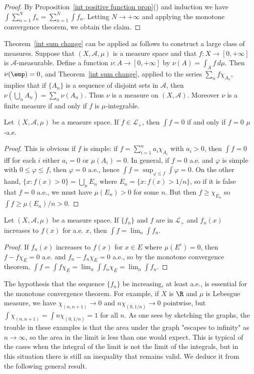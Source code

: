 \begin{proof}
By Proposition~\ref{int positive function prop}() and induction we have $\int\sum_{n=1}^{N}f_n=\sum_{n=1}^{N}\int f_n$. Letting $N\to+\infty$ and applying the monotone convergence theorem, we obtain the claim.
\end{proof}
\begin{example}\label{measure defined by int}
Theorem~\ref{int sum change} can be applied as follows to construct a large class of measures. Suppose that $(X,\mathcal{A},\mu)$ is a measure space and that $f:X\to[0,+\infty]$ is $\mathcal{A}$-measurable. Define a function $\nu:A\to[0,+\infty]$ by $\nu(A)=\int_Af\,d\mu$. Then $\nu(\emp)=0$, and Theorem~\ref{int sum change}, applied to the series $\sum_nf\chi_{A_n}$, implies that if $\{A_n\}$ is a sequence of disjoint sets in $\mathcal{A}$, then $\nu(\bigcup_nA_n)=\sum_n\nu(A_n)$. Thus $\nu$ is a measure on $(X,\mathcal{A})$. Moreover $\nu$ is a finite measure if and only if $f$ is $\mu$-integrable.
\end{example}
\begin{proposition}\label{int zero iff a.e. zero}
Let $(X,\mathcal{A},\mu)$ be a measure space. If $f\in\mathcal{L}_+$, then $\int f=0$ if and only if $f=0$ $\mu$-a.e.
\end{proposition}
\begin{proof}
This is obvious if $f$ is simple: if $f=\sum_{i=1}^{n}a_i\chi_{A_i}$ with $a_i>0$, then $\int f=0$ iff for each $i$ either $a_i=0$ or $\mu(A_i)=0$. In general, if $f=0$ a.e. and $\varphi$ is simple with $0\leq\varphi\leq f$, then $\varphi=0$ a.e., hence $\int f=\sup_{\varphi\leq f}\int\varphi=0$. On the other hand, $\{x:f(x)>0\}=\bigcup_nE_n$ where $E_n=\{x:f(x)>1/n\}$, so if it is false that $f=0$ a.e., we must have $\mu(E_n)>0$ for some $n$. But then $f\geq\chi_{E_n}$ so $\int f\geq\mu(E_n)/n>0$.
\end{proof}
\begin{corollary}
Let $(X,\mathcal{A},\mu)$ be a measure space. If $\{f_n\}$ and $f$ are in $\mathcal{L}_+$ and $f_n(x)$ increases to $f(x)$ for a.e. $x$, then $\int f=\lim_n\int f_n$.
\end{corollary}
\begin{proof}
If $f_n(x)$ increases to $f(x)$ for $x\in E$ where $\mu(E^c)=0$, then $f-f\chi_E=0$ a.e. and $f_n-f_n\chi_E=0$ a.e., so by the monotone convergence theorem,  $\int f=\int f\chi_E=\lim_n\int f_n\chi_E=\lim_n\int f_n$.
\end{proof}
The hypothesis that the sequence $\{f_n\}$ be increasing, at least a.e., is essential for the monotone convergence theorem. For example, if $X$ is $\R$ and $\mu$ is Lebesgue measure, we have $\chi_{(n,n+1)}\to 0$ and $n\chi_{(0,1/n)}\to 0$ pointwise, but $\int\chi_{(n,n+1)}=\int n\chi_{(0,1/n)}=1$ for all $n$. As one sees by sketching the graphs, the trouble in these examples is that the area under the graph "escapes to infinity" as $n\to\infty$, so the area in the limit is less than one would expect. This is typical of the cases when the integral of the limit is not the limit of the integrals, but in this situation there is still an inequality that remains valid. We deduce it from the following general result.
